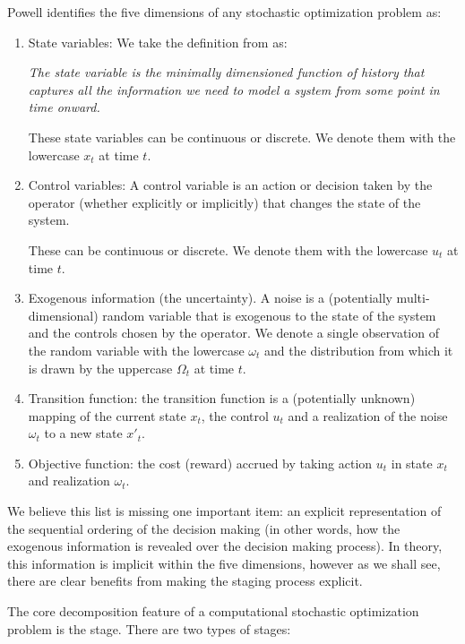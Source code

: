 \documentclass[final,1p,times]{elsarticle}
\begin{document}
Powell identifies the five dimensions of any stochastic optimization problem as:
\begin{enumerate}
    \item State variables: We take the definition from \cite{powell_tutORial} as:

\emph{The state variable is the minimally dimensioned function of history that captures all the information we need to model a system from some point in time onward.}

These state variables can be continuous or discrete. We denote them with the lowercase $x_t$ at time $t$.

    \item Control variables: A control variable is an action or decision taken by the operator (whether explicitly or implicitly) that changes the state of the system.
    
    These can be continuous or discrete. We denote them with the lowercase $u_t$ at time $t$.
    
    \item Exogenous information (the uncertainty). A noise is a (potentially multi-dimensional) random variable that is exogenous to the state of the system and the controls chosen by the operator. We denote a single observation of the random variable with the lowercase $\omega_t$ and the distribution from which it is drawn by the uppercase $\Omega_t$ at time $t$.
    
    \item Transition function: the transition function is a (potentially unknown) mapping of the current state $x_t$, the control $u_t$ and a realization of the noise $\omega_t$ to a new state $x'_t$.
    
    \item Objective function: the cost (reward) accrued by taking action $u_t$ in state $x_t$ and realization $\omega_t$.
\end{enumerate}

We believe this list is missing one important item: an explicit representation of the sequential ordering of the decision making (in other words, how the exogenous information is revealed over the decision making process). In theory, this information is implicit within the five dimensions, however as we shall see, there are clear benefits from making the staging process explicit.

The core decomposition feature of a computational stochastic optimization problem is the stage. There are two types of stages:
\end{document}

